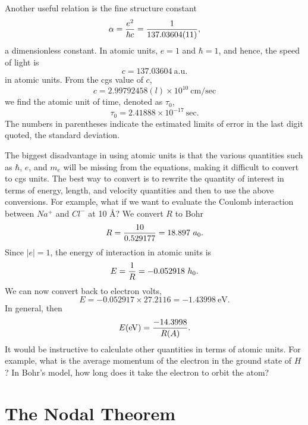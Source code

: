 Another useful relation is the fine structure constant
\begin{equation}
\alpha = {e^2 \over \hbar c} = {1 \over 137.03604(11)},
\end{equation}
a dimensionless constant. In atomic units, $e = 1$ and $\hbar =1$, and 
hence, the speed of light is
\begin{equation}
c = 137.03604\ \mathrm{a.u.}
\end{equation}
in atomic units. From the cgs value of $c$,
\begin{equation}
c = 2.99792458(l) \times 10^{10}\ \mathrm{cm}/\mathrm{sec}
\end{equation}
we find the atomic unit of time, denoted as $\tau_0$,
\begin{equation}
\tau_0 = 2.41888 \times 10^{-17}\ \mathrm{sec}.
\end{equation}
The numbers in parentheses indicate the estimated limits of error in the last
digit quoted, the standard deviation.

The biggest disadvantage in using atomic units is that the various 
quantities such as $\hbar$, $e$, and $m_e$ will be missing from the equations, 
making it difficult to convert to cgs units. The best way to convert is to 
rewrite the quantity of interest in terms of energy, length, and velocity 
quantities and then to use the above conversions. For example, what if we 
want to evaluate the Coulomb interaction between $Na^+$ and $Cl^-$ at 10
\AA? We convert $R$ to Bohr
\begin{equation}
R = {10 \over 0.529177} = 18.897\ a_0.
\end{equation}
Since $|e| = 1$, the energy of interaction in atomic units is
\begin{equation}
E = {1 \over R} = - 0.052918\ h_0.
\end{equation}
We can now convert back to electron volts,
\begin{equation}
E = -0.052917 \times 27.2116 = -1.43998\ \mathrm{eV}.
\end{equation}
In general, then
\begin{equation}
E(\mathrm{eV}) = {-14.3998 \over R(A)}.
\end{equation}
It would be instructive to calculate other quantities in terms of atomic 
units. For example, what is the average momentum of the electron in the 
ground state of $H$? In Bohr's model, how
long does it take the electron to orbit the atom?

\section{The Nodal Theorem}

